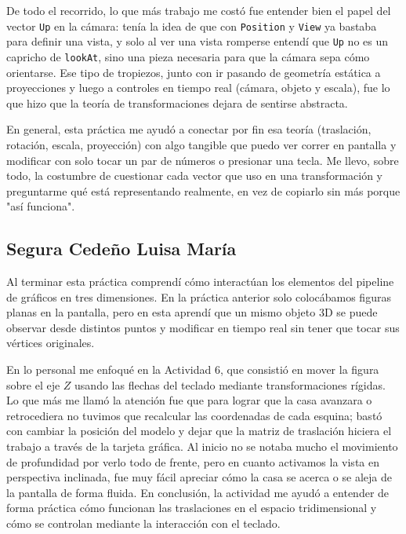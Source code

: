 De todo el recorrido, lo que más trabajo me costó fue entender bien el papel del vector \texttt{Up} en la cámara: tenía la idea de que con \texttt{Position} y \texttt{View} ya bastaba para definir una vista, y solo al ver una vista romperse entendí que \texttt{Up} no es un capricho de \texttt{lookAt}, sino una pieza necesaria para que la cámara sepa cómo orientarse. Ese tipo de tropiezos, junto con ir pasando de geometría estática a proyecciones y luego a controles en tiempo real (cámara, objeto y escala), fue lo que hizo que la teoría de transformaciones dejara de sentirse abstracta.
 
En general, esta práctica me ayudó a conectar por fin esa teoría (traslación, rotación, escala, proyección) con algo tangible que puedo ver correr en pantalla y modificar con solo tocar un par de números o presionar una tecla. Me llevo, sobre todo, la costumbre de cuestionar cada vector que uso en una transformación y preguntarme qué está representando realmente, en vez de copiarlo sin más porque "así funciona".

\subsection{Segura Cedeño Luisa María}

Al terminar esta práctica comprendí cómo interactúan los elementos del pipeline de gráficos en tres dimensiones. En la práctica anterior solo colocábamos figuras planas en la pantalla, pero en esta aprendí que un mismo objeto 3D se puede observar desde distintos puntos y modificar en tiempo real sin tener que tocar sus vértices originales.

En lo personal me enfoqué en la Actividad 6, que consistió en mover la figura sobre el eje $Z$ usando las flechas del teclado mediante transformaciones rígidas. Lo que más me llamó la atención fue que para lograr que la casa avanzara o retrocediera no tuvimos que recalcular las coordenadas de cada esquina; bastó con cambiar la posición del modelo y dejar que la matriz de traslación hiciera el trabajo a través de la tarjeta gráfica. Al inicio no se notaba mucho el movimiento de profundidad por verlo todo de frente, pero en cuanto activamos la vista en perspectiva inclinada, fue muy fácil apreciar cómo la casa se acerca o se aleja de la pantalla de forma fluida. En conclusión, la actividad me ayudó a entender de forma práctica cómo funcionan las traslaciones en el espacio tridimensional y cómo se controlan mediante la interacción con el teclado.
